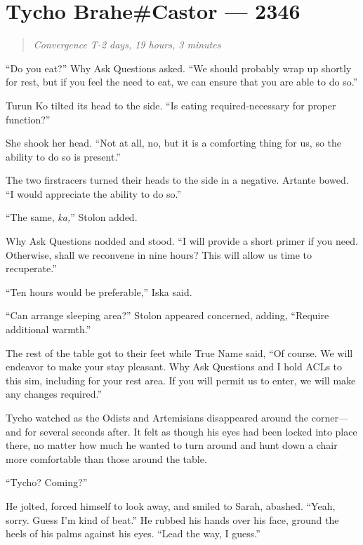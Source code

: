 \hypertarget{tycho-brahecastor-2346}{%
\chapter{Tycho Brahe\#Castor — 2346}}

\begin{quote}
\emph{Convergence T-2 days, 19 hours, 3 minutes}
\end{quote}

\noindent ``Do you eat?'' Why Ask Questions asked. ``We should probably wrap up shortly for rest, but if you feel the need to eat, we can ensure that you are able to do so.''

Turun Ko tilted its head to the side. ``Is eating required-necessary for proper function?''

She shook her head. ``Not at all, no, but it is a comforting thing for us, so the ability to do so is present.''

The two firstracers turned their heads to the side in a negative. Artante bowed. ``I would appreciate the ability to do so.''

``The same, \emph{ka,}'' Stolon added.

Why Ask Questions nodded and stood. ``I will provide a short primer if you need. Otherwise, shall we reconvene in nine hours? This will allow us time to recuperate.''

``Ten hours would be preferable,'' Iska said.

``Can arrange sleeping area?'' Stolon appeared concerned, adding, ``Require additional warmth.''

The rest of the table got to their feet while True Name said, ``Of course. We will endeavor to make your stay pleasant. Why Ask Questions and I hold ACLs to this sim, including for your rest area. If you will permit us to enter, we will make any changes required.''

Tycho watched as the Odists and Artemisians disappeared around the corner—and for several seconds after. It felt as though his eyes had been locked into place there, no matter how much he wanted to turn around and hunt down a chair more comfortable than those around the table.

``Tycho? Coming?''

He jolted, forced himself to look away, and smiled to Sarah, abashed. ``Yeah, sorry. Guess I'm kind of beat.'' He rubbed his hands over his face, ground the heels of his palms against his eyes. ``Lead the way, I guess.''

